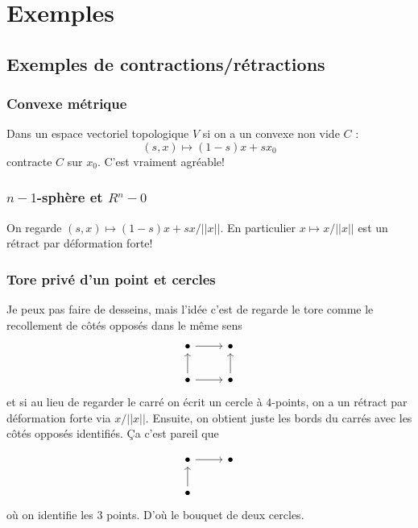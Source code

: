 \documentclass[a4paper,12pt]{book}
\theoremstyle{plain}
\theoremstyle{definition}
\theoremstyle{remark}
\begin{document}
\chapter{Exemples}
\section{Exemples de contractions/rétractions}
\subsection{Convexe métrique}
Dans un espace vectoriel topologique $V$ si on 
a un convexe non vide $C$ :
\[(s,x)\mapsto (1-s)x+sx_0\]
contracte $C$ sur $x_0$. C'est vraiment agréable!
\subsection{$n-1$-sphère et $R^n-0$}
On regarde $(s,x)\mapsto (1-s)x+sx/||x||$. En 
particulier $x\mapsto x/||x||$ est
un rétract par déformation forte!
\subsection{Tore privé d'un point et cercles}
Je peux pas faire de desseins, mais l'idée c'est de regarde le
tore comme le recollement de côtés opposés dans le même sens 
\[\begin{tikzcd}
	\bullet & \bullet \\
	\bullet & \bullet
	\arrow[from=1-1, to=1-2]
	\arrow[from=2-1, to=1-1]
	\arrow[from=2-1, to=2-2]
	\arrow[from=2-2, to=1-2]
\end{tikzcd}\]
et si au lieu de regarder le carré on écrit un cercle à $4$-points,
on a un rétract par déformation forte via $x/||x||$. Ensuite, 
on obtient juste les bords du carrés avec les côtés opposés 
identifiés. Ça c'est pareil que

\[\begin{tikzcd}
	\bullet & \bullet \\
	\bullet
	\arrow[from=1-1, to=1-2]
	\arrow[from=2-1, to=1-1]
\end{tikzcd}\]
où on identifie les $3$ points. D'où le bouquet de deux cercles.
\end{document}
